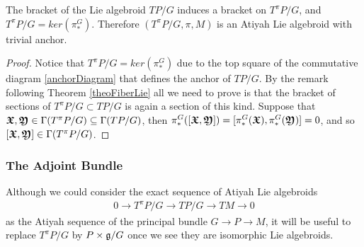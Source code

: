 \begin{theorem}
The bracket of the Lie algebroid $TP/G$ induces a bracket on $T^\pi P/G$, and $T^\pi P/G = ker(\pi_*^G)$. Therefore $(T^\pi P/G, \pi, M)$ is an Atiyah Lie algebroid with trivial anchor.
\end{theorem}

\begin{proof}
Notice that $T^\pi P/G = ker(\pi_*^G)$ due to the top square of the commutative diagram \ref{anchorDiagram} that defines the anchor of $TP/G$. By the remark following Theorem \ref{theoFiberLie} all we need to prove is that the bracket of sections of $T^\pi P/G \subset TP/G$ is again a section of this kind. Suppose that $\bm{\mathfrak{X}}, \bm{\mathfrak{Y}} \in \Gamma(T^\pi P/G) \subseteq \Gamma(TP/G)$, then $\pi_*^G([\bm{\mathfrak{X}}, \bm{\mathfrak{Y}}]) = [\pi_*^G (\bm{\mathfrak{X}}), \pi_*^G(\bm{\mathfrak{Y}})] \\= 0$, and so $[\bm{\mathfrak{X}}, \bm{\mathfrak{Y}}] \in \Gamma(T^\pi P/G)$. 
\end{proof}

\subsubsection{The Adjoint Bundle}

Although we could consider the exact sequence of Atiyah Lie algebroids
\begin{align*}
    0 \to T^\pi P/G \to TP/G \to TM \to 0
\end{align*}
as the Atiyah sequence of the principal bundle $G \to P \to M$, it will be useful to replace $T^\pi P/G$ by $P \times \mathfrak{g}/G$ once we see they are isomorphic Lie algebroids.


